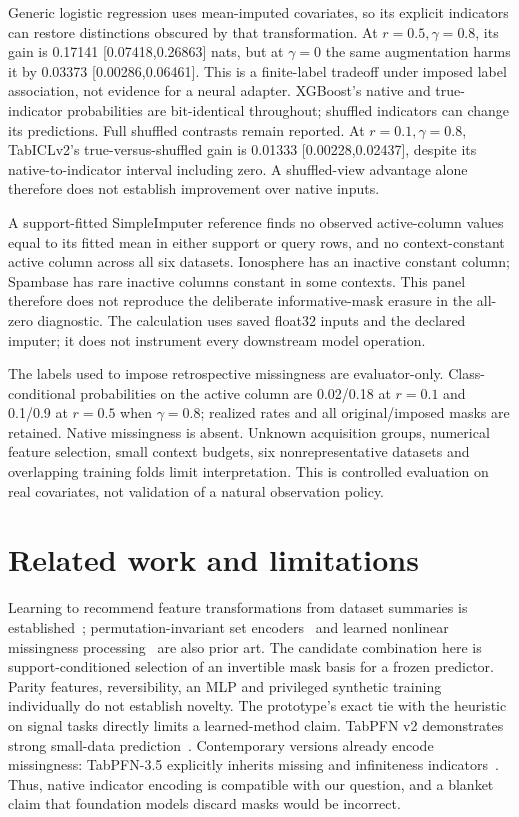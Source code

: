 \documentclass[10pt]{article}
\begin{document}
Generic logistic regression uses mean-imputed covariates, so its explicit indicators can restore distinctions obscured by that transformation. At $r=0.5,\gamma=0.8$, its gain is 0.17141 [0.07418,0.26863] nats, but at $\gamma=0$ the same augmentation harms it by 0.03373 [0.00286,0.06461]. This is a finite-label tradeoff under imposed label association, not evidence for a neural adapter. XGBoost's native and true-indicator probabilities are bit-identical throughout; shuffled indicators can change its predictions. Full shuffled contrasts remain reported. At $r=0.1,\gamma=0.8$, TabICLv2's true-versus-shuffled gain is 0.01333 [0.00228,0.02437], despite its native-to-indicator interval including zero. A shuffled-view advantage alone therefore does not establish improvement over native inputs.

A support-fitted SimpleImputer reference finds no observed active-column values equal to its fitted mean in either support or query rows, and no context-constant active column across all six datasets. Ionosphere has an inactive constant column; Spambase has rare inactive columns constant in some contexts. This panel therefore does not reproduce the deliberate informative-mask erasure in the all-zero diagnostic. The calculation uses saved float32 inputs and the declared imputer; it does not instrument every downstream model operation.

The labels used to impose retrospective missingness are evaluator-only. Class-conditional probabilities on the active column are 0.02/0.18 at $r=0.1$ and 0.1/0.9 at $r=0.5$ when $\gamma=0.8$; realized rates and all original/imposed masks are retained. Native missingness is absent. Unknown acquisition groups, numerical feature selection, small context budgets, six nonrepresentative datasets and overlapping training folds limit interpretation. This is controlled evaluation on real covariates, not validation of a natural observation policy.

\section{Related work and limitations}
Learning to recommend feature transformations from dataset summaries is established~\cite{nargesian}; permutation-invariant set encoders~\cite{deepsets} and learned nonlinear missingness processing~\cite{neumiss} are also prior art. The candidate combination here is support-conditioned selection of an invertible mask basis for a frozen predictor. Parity features, reversibility, an MLP and privileged synthetic training individually do not establish novelty. The prototype's exact tie with the heuristic on signal tasks directly limits a learned-method claim.
TabPFN v2 demonstrates strong small-data prediction~\cite{hollmann2025}. Contemporary versions already encode missingness: TabPFN-3.5 explicitly inherits missing and infiniteness indicators~\cite{priorlabs2026}. Thus, native indicator encoding is compatible with our question, and a blanket claim that foundation models discard masks would be incorrect.
\end{document}
